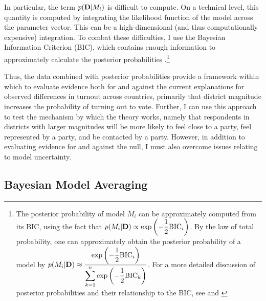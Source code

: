 \documentclass[12pt]{article}
\begin{document}
In particular, the term $p({\bf D} | M_i)$ is difficult to compute. On a technical level, this quantity is computed by integrating the likelihood function of the model across the parameter vector. This can be a high-dimensional (and thus computationally expensive) integration. To combat these difficulties, I use the Bayesian Information Criterion (BIC), which contains enough information to approximately calculate the posterior probabilities \citep{Raftery1995, KassRaftery1995}.\footnote{The posterior probability of model $M_i$ can be approximately computed from its BIC, using the fact that $p(M_i | {\bf D}) \propto \text{exp} \left( -\dfrac{1}{2}\text{BIC}_i \right)$. By the law of total probability, one can approximately obtain the posterior probability of a model by $p(M_i | {\bf D}) \approx \dfrac{\text{exp} \left( -\dfrac{1}{2}\text{BIC}_i \right)}{\displaystyle \sum_{k = 1}^n \text{exp} \left( -\dfrac{1}{2}\text{BIC}_k \right)}$. For a more detailed discussion of posterior probabilities and their relationship to the BIC, see \cite{Raftery1995} and \cite{KassRaftery1995}}

Thus, the data combined with posterior probabilities provide a framework within which to evaluate evidence both for and against the current explanations for observed differences in turnout across countries, primarily that district magnitude increases the probability of turning out to vote. Further, I can use this approach to test the mechanism by which the theory works, namely that respondents in districts with larger magnitudes will be more likely to feel close to a party, feel represented by a party, and be contacted by a party. However, in addition to evaluating evidence for  and against the null, I must also overcome issues relating to model uncertainty.

\subsection*{Bayesian Model Averaging} 
\end{document}
